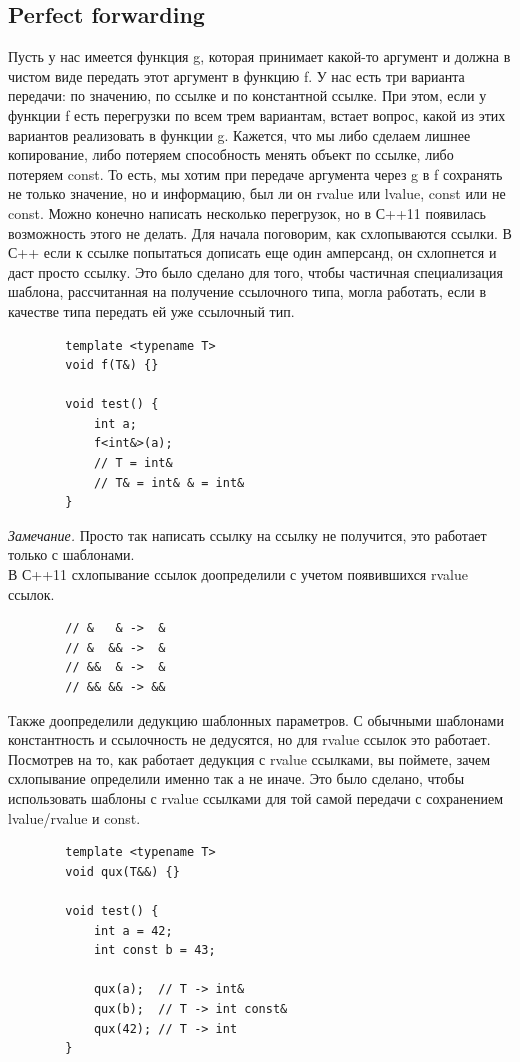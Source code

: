\documentclass[12pt, a4paper]{article}
\begin{document}
	\subsection{Perfect forwarding}
	Пусть у нас имеется функция g, которая принимает какой-то аргумент и должна в чистом виде передать этот аргумент в функцию f. У нас есть три варианта передачи: по значению, по ссылке и по константной ссылке. При этом, если у функции f есть перегрузки по всем трем вариантам, встает вопрос, какой из этих вариантов реализовать в функции g. Кажется, что мы либо сделаем лишнее копирование, либо потеряем способность менять объект по ссылке, либо потеряем const. То есть, мы хотим при передаче аргумента через g в f сохранять не только значение, но и информацию, был ли он rvalue или lvalue, const или не const. Можно конечно написать несколько перегрузок, но в С++11 появилась возможность этого не делать. Для начала поговорим, как схлопываются ссылки. В С++ если к ссылке попытаться дописать еще один амперсанд, он схлопнется и даст просто ссылку. Это было сделано для того, чтобы частичная специализация шаблона, рассчитанная на получение ссылочного типа, могла работать, если в качестве типа передать ей уже ссылочный тип.
	\begin{verbatim}
		template <typename T>
		void f(T&) {}
		
		void test() {
			int a;
			f<int&>(a);
			// T = int&
			// T& = int& & = int&
		}
	\end{verbatim}
	\textit{Замечание.} Просто так написать ссылку на ссылку не получится, это работает только с шаблонами.\\
	В С++11 схлопывание ссылок доопределили с учетом появившихся rvalue ссылок.
	\begin{verbatim}
		// &   & ->  &
		// &  && ->  &
		// &&  & ->  &
		// && && -> &&
	\end{verbatim}
	Также доопределили дедукцию шаблонных параметров. С обычными шаблонами константность и ссылочность не дедусятся, но для rvalue ссылок это работает. Посмотрев на то, как работает дедукция с rvalue ссылками, вы поймете, зачем схлопывание определили именно так а не иначе. Это было сделано, чтобы использовать шаблоны с rvalue ссылками для той самой передачи с сохранением lvalue/rvalue и const.
	\begin{verbatim}
		template <typename T>
		void qux(T&&) {}
		
		void test() {
			int a = 42;
			int const b = 43;
			
			qux(a);  // T -> int&
			qux(b);  // T -> int const&
			qux(42); // T -> int
		}
	\end{verbatim}
\end{document}
